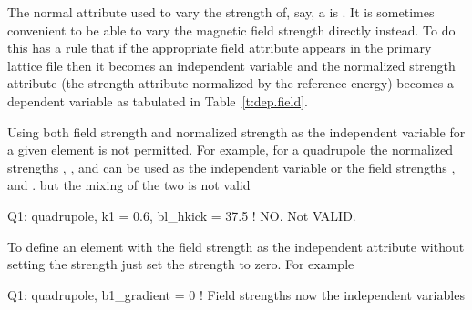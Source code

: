 The normal attribute used to vary the strength of, say, a
 is .  It is sometimes convenient to be able to
vary the magnetic field strength directly instead. To do this \bmad
has a rule that if the appropriate field attribute appears in the
primary lattice file then it becomes an independent variable and the
normalized strength attribute (the strength attribute normalized by
the reference energy) becomes a dependent variable as tabulated in
Table~\ref{t:dep.field}.
\begin{table}[ht]
\caption {Field and Strength Attributes.}
\label{t:dep.field}
\end{table}
Using both field strength and normalized strength as the independent
variable for a given element is not permitted. For example, for a quadrupole the 
normalized strengths , , and  can be used as the
independent variable or the field strengths ,  and
. but the mixing of the two is not valid
\begin{example}
  Q1: quadrupole, k1 = 0.6, bl_hkick = 37.5  ! NO. Not VALID.
\end{example}
To define an element with the field strength as the independent
attribute without setting the strength just set the strength to zero. For example
\begin{example}
  Q1: quadrupole, b1_gradient = 0   ! Field strengths now the independent variables
\end{example}


